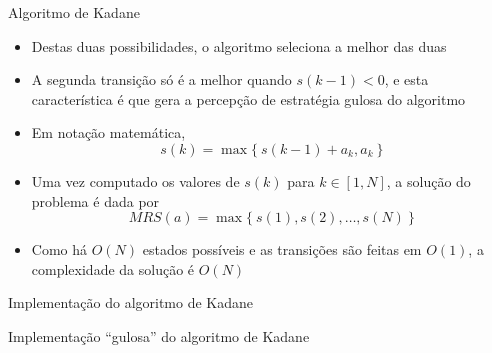 \begin{frame}[fragile]{Algoritmo de Kadane}

    \begin{itemize}
        \item Destas duas possibilidades, o algoritmo seleciona a melhor das duas

        \item A segunda transição só é a melhor quando $s(k - 1) < 0$, e esta característica é
            que gera a percepção de estratégia gulosa do algoritmo

        \item Em notação matemática,
        \[
            s(k) = \max\{\ s(k - 1) + a_k, a_k\ \}
        \]

        \item Uma vez computado os valores de $s(k)$ para $k\in[1, N]$, a solução do problema
            é dada por
        \[
            MRS(a) = \max\{\ s(1), s(2), \ldots, s(N)\ \}
        \]

        \item Como há $O(N)$ estados possíveis e as transições são feitas em $O(1)$, a complexidade
            da solução é $O(N)$
    \end{itemize}

\end{frame}

\begin{frame}[fragile]{Implementação do algoritmo de Kadane}
\end{frame}

\begin{frame}[fragile]{Implementação ``gulosa'' do algoritmo de Kadane}
\end{frame}
